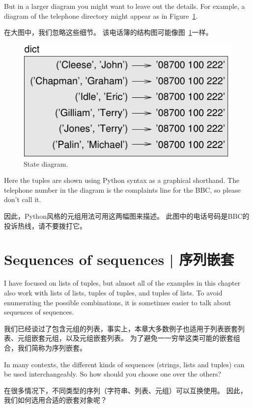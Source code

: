 But in a larger diagram you might want to leave out the
details.  For example, a diagram of the telephone directory might
appear as in Figure~\ref{fig.dict2}.

在大图中，我们忽略这些细节。 该电话簿的结构图可能像图~\ref{fig.dict2}一样。

\begin{figure}
\centerline
{\includegraphics[scale=0.8]{../source/figs/dict2.pdf}}
\caption{State diagram.}
\label{fig.dict2}
\end{figure}

Here the tuples are shown using Python syntax as a graphical
shorthand.  The telephone number in the diagram is the complaints line
for the BBC, so please don't call it.

因此，Python风格的元组用法可用这两幅图来描述。 此图中的电话号码是BBC的投诉热线，请不要拨打它。


\section{Sequences of sequences | 序列嵌套}

I have focused on lists of tuples, but almost all of the examples in
this chapter also work with lists of lists, tuples of tuples, and
tuples of lists.  To avoid enumerating the possible combinations, it
is sometimes easier to talk about sequences of sequences.

我们已经谈过了包含元组的列表，事实上，本章大多数例子也适用于列表嵌套列表、元组嵌套元组，以及元组嵌套列表。 为了避免一一穷举这类可能的嵌套组合，我们简称为序列嵌套。

In many contexts, the different kinds of sequences (strings, lists and
tuples) can be used interchangeably.  So how should you choose one
over the others?

在很多情况下，不同类型的序列（字符串、列表、元组）可以互换使用。 因此，我们如何选用合适的嵌套对象呢？
   

